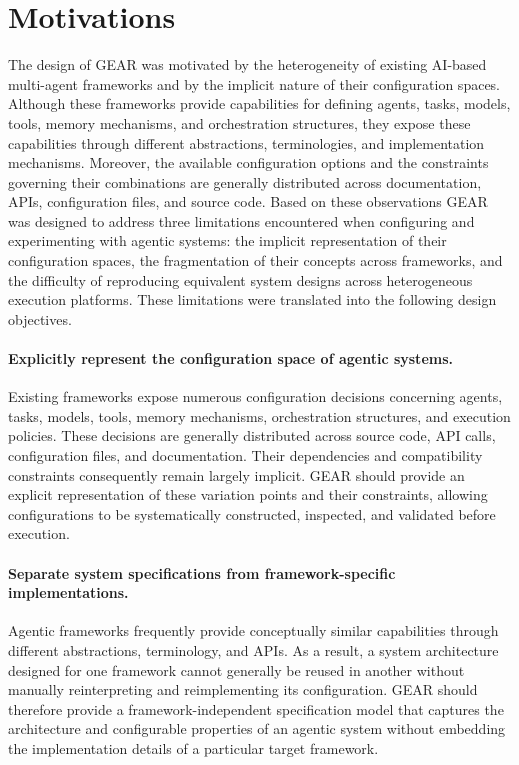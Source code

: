 \section{Motivations}
\label{subsec:gear-design-objectives}

The design of GEAR was motivated by the heterogeneity of existing AI-based multi-agent frameworks and by the implicit nature of their configuration spaces. Although these frameworks provide capabilities for defining agents, tasks, models, tools, memory mechanisms, and orchestration structures, they expose these capabilities through different abstractions, terminologies, and implementation mechanisms. Moreover, the available configuration options and the constraints governing their combinations are generally distributed across documentation, APIs, configuration files, and source code. Based on these observations GEAR was designed to address three limitations encountered when configuring and experimenting with agentic systems: the implicit representation of their configuration spaces, the fragmentation of their concepts across frameworks, and the difficulty of reproducing equivalent system designs across heterogeneous execution platforms. These limitations were translated into the following design objectives.

\paragraph{\textbf{Explicitly represent the configuration space of
agentic systems.}}
Existing frameworks expose numerous configuration decisions concerning
agents, tasks, models, tools, memory mechanisms, orchestration structures,
and execution policies. These decisions are generally distributed across
source code, API calls, configuration files, and documentation. Their
dependencies and compatibility constraints consequently remain largely
implicit. GEAR should provide an explicit representation of these variation
points and their constraints, allowing configurations to be systematically
constructed, inspected, and validated before execution.

\paragraph{\textbf{Separate system specifications from
framework-specific implementations.}}
Agentic frameworks frequently provide conceptually similar capabilities
through different abstractions, terminology, and APIs. As a result, a system
architecture designed for one framework cannot generally be reused in
another without manually reinterpreting and reimplementing its configuration.
GEAR should therefore provide a framework-independent specification model
that captures the architecture and configurable properties of an agentic
system without embedding the implementation details of a particular target
framework.

